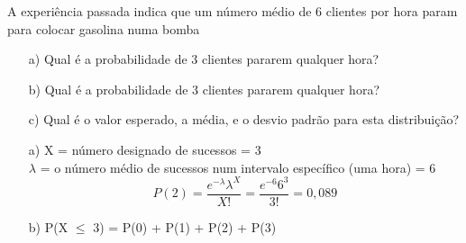 \documentclass[10pt,a4paper]{article}
\begin{document}
\begin{ex}
	A experiência passada indica que um número médio de 6 clientes por hora param para colocar gasolina numa bomba
	\begin{itemize}
		\item[a)] Qual é a probabilidade de 3 clientes pararem qualquer hora? 
		\item[b)] Qual é a probabilidade de 3 clientes pararem qualquer hora? 
		\item[c)] Qual é o valor esperado, a média, e o desvio padrão para esta distribuição? 
	\end{itemize}
\end{ex}
\begin{sol}
	\begin{itemize}
		\item[a)]X = número designado de sucessos = 3 \\
		$\lambda$ = o número médio de sucessos num intervalo específico (uma hora) = 6 
		\[P(2) = \frac{e^{-\lambda}\lambda^{X}}{X!}	= \frac{e^{-6}6^{3}}{3!} = 0,089\]
		\item[b)]P(X $\leq$ 3) = P(0) + P(1) + P(2) + P(3) 
	\end{itemize}
\end{sol}
\end{document}
